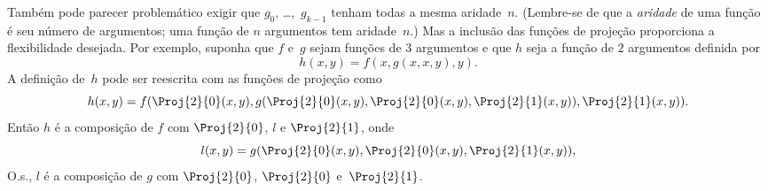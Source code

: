 \documentclass[../../../include/open-logic-section]{subfiles}
\begin{document}
Também pode parecer problemático exigir que $g_0$, \dots,~$g_{k-1}$ tenham
todas a mesma aridade~$n$. (Lembre-se de que a \emph{aridade} de uma função é
seu número de argumentos; uma função de $n$ argumentos tem aridade~$n$.) Mas
a inclusão das funções de projeção proporciona a flexibilidade desejada. Por
exemplo, suponha que $f$ e~$g$ sejam funções de $3$ argumentos e que $h$ seja
a função de $2$ argumentos definida por
\[
h(x,y) = f(x,g(x,x,y),y).
\]
A definição de~$h$ pode ser reescrita com as funções de projeção como
\[
h(x,y) = f(\Proj{2}{0}(x,y), g(\Proj{2}{0}(x,y), \Proj{2}{0}(x,y),
\Proj{2}{1}(x,y)), \Proj{2}{1}(x,y)).
\]
Então $h$ é a composição de $f$ com $\Proj{2}{0}$, $l$ e
$\Proj{2}{1}$, onde
\[
l(x,y) = g(\Proj{2}{0}(x,y),\Proj{2}{0}(x,y),\Proj{2}{1}(x,y)),
\]
O.s.\@, $l$ é a composição de $g$ com $\Proj{2}{0}$, $\Proj{2}{0}$
e~$\Proj{2}{1}$.
\end{document}

